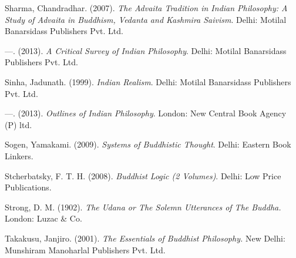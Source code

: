 \begin{thebibliography}{99}
  Sharma, Chandradhar. (2007). \textit{The Advaita Tradition in Indian Philosophy: A Study of Advaita in Buddhism, Vedanta and Kashmira Saivism}. Delhi: Motilal Banarsidass Publishers Pvt. Ltd.

  —. (2013). \textit{A Critical Survey of Indian Philosophy}. Delhi: Motilal Banarsidass Publishers Pvt. Ltd.

  Sinha, Jadunath. (1999). \textit{Indian Realism}. Delhi: Motilal Banarsidass Publishers Pvt. Ltd.

  —. (2013). \textit{Outlines of Indian Philosophy}. London: New Central Book Agency (P) ltd.

  Sogen, Yamakami. (2009). \textit{Systems of Buddhistic Thought}. Delhi: Eastern Book Linkers.

  Stcherbatsky, F. T. H. (2008). \textit{Buddhist Logic (2 Volumes)}. Delhi: Low Price Publications.

  Strong, D. M. (1902). \textit{The Udana or The Solemn Utterances of The Buddha.} London: Luzac \& Co.

  Takakusu, Janjiro. (2001). \textit{The Essentials of Buddhist Philosophy.} New Delhi: Munshiram Manoharlal Publishers Pvt. Ltd.
 
 \end{thebibliography}

\theendnotes

